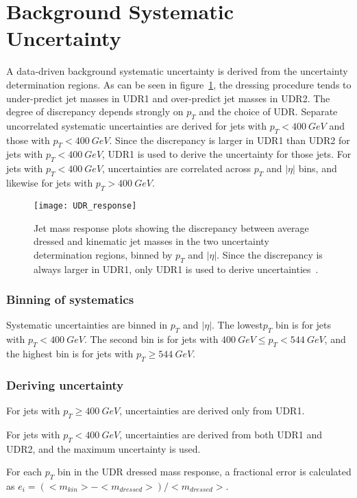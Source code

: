 \section{Background Systematic Uncertainty} \label{sec:bkg_uncert}
A data-driven background systematic uncertainty is derived from the uncertainty determination regions.
As can be seen in figure~\ref{fig:udr_response}, the dressing procedure tends to under-predict jet masses in UDR1 and over-predict jet masses in UDR2.
The degree of discrepancy depends strongly on $p_T$ and the choice of UDR.
Separate uncorrelated systematic uncertainties are derived for jets with $p_T<400~GeV$ and those with $p_T<400~GeV$.
Since the discrepancy is larger in UDR1 than UDR2 for jets with $p_T<400~GeV$, UDR1 is used to derive the uncertainty for those jets.
For jets with $p_T<400~GeV$, uncertainties are correlated across $p_T$ and $|\eta|$ bins, and likewise for jets with $p_T>400~GeV$.

\begin{figure}[!ht]
    \texttt{[image: UDR\_response]}
    \caption{Jet mass response plots showing the discrepancy between average dressed and kinematic jet masses in the two uncertainty
    determination regions, binned by $p_T$ and $|\eta|$.
    Since the discrepancy is always larger in UDR1, only UDR1 is used to derive uncertainties~\cite{paper-plb}.}
    \label{fig:udr_response}
\end{figure}

\subsubsection{Binning of systematics}
Systematic uncertainties are binned in $p_{T}$ and $|\eta|$.
The lowest$p_{T}$ bin is for jets with $p_{T} < 400~GeV$.
The second bin is for jets with $400~GeV \leq p_T < 544~GeV$, and the highest bin is for jets with $p_T \geq 544~GeV$.

\subsubsection{Deriving uncertainty}
For jets with $p_{T} \geq 400~GeV$, uncertainties are derived only from UDR1.

For jets with $p_{T} < 400~GeV$, uncertainties are derived from both UDR1 and UDR2, and the maximum uncertainty is used.

For each $p_T$ bin in the UDR dressed mass response, a fractional error is calculated as $e_i=\left(<m_{kin}>-<m_{dressed}>\right)/<m_{dressed}>$.


